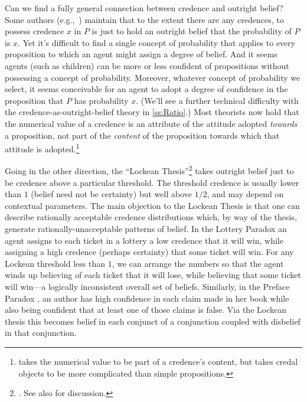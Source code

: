 Can we find a fully general connection between credence and outright belief? Some authors (e.g.,\ \citealp{HoltonModel}) maintain that to the extent there are any credences, to possess credence $x$ in $P$ is just to hold an outright belief that the probability of $P$ is $x$.\label{titelbaum-outright} Yet it's difficult to find a single concept of probability that applies to every proposition to which an agent might assign a degree of belief. And it seems agents (such as children) can be more or less confident of propositions without possessing a concept of probability. Moreover, whatever concept of probability we select, it seems conceivable for an agent to adopt a degree of confidence in the proposition that $P$ has probability $x$. (We'll see a further technical difficulty with the credence-as-outright-belief theory in \autoref{ss:Ratio}.) Most theorists now hold that the numerical value of a credence is an attribute of the attitude adopted \emph{towards} a proposition, not part of the \emph{content} of the proposition towards which that attitude is adopted.\footnote
{\citet{MossProbabilistic} takes the numerical value to be part of a credence's content, but takes credal objects to be more complicated than simple propositions.}

Going in the other direction, the ``Lockean Thesis''\footnote
{\citet[Bk.\ IV]{LockeEssay}. See also \citet{FoleyNet} for discussion.}
 takes outright belief just to be credence above a particular threshold. The threshold credence is usually lower than $1$ (belief need not be certainty) but well above $1/2$, and may depend on contextual parameters. The main objection to the Lockean Thesis is that one can describe rationally acceptable credence distributions which, by way of the thesis, generate rationally-unacceptable patterns of belief. In the Lottery Paradox \citep{KyburgProbability}\label{titelbaum-lottery} an agent assigns to each ticket in a lottery a low credence that it will win, while assigning a high credence (perhaps certainty) that some ticket will win. For any Lockean threshold less than $1$, we can arrange the numbers so that the agent winds up believing of each ticket that it will lose, while believing that some ticket will win---a logically inconsistent overall set of beliefs. Similarly, in the Preface Paradox \citep{MakinsonPreface}, an author has high confidence in each claim made in her book while also being confident that at least one of those claims is false. Via the Lockean thesis this becomes belief in each conjunct of a conjunction coupled with disbelief in that conjunction.
 
